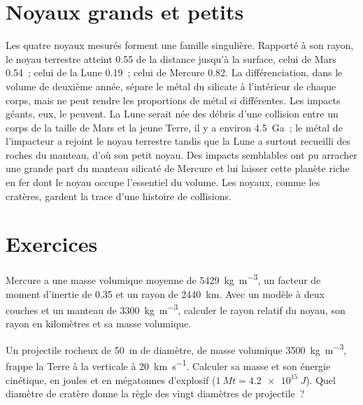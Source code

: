 \section{Noyaux grands et petits}\label{sec:b3:planetary-interiors-surfaces:cores}

Les quatre noyaux mesurés forment une famille singulière. Rapporté à son rayon, le
noyau terrestre atteint 0.55 de la distance jusqu'à la surface, celui de Mars 0.54~;
celui de la Lune 0.19~; celui de Mercure 0.82. La différenciation, dans le volume de
deuxième année, sépare le métal du silicate à l'intérieur de chaque corps, mais ne peut rendre les
proportions de métal si différentes. Les impacts géants, eux, le peuvent. La Lune serait
née des débris d'une collision entre un corps de la taille de Mars et la jeune Terre, il y a
environ 4.5~Ga~; le métal de l'impacteur a rejoint le noyau terrestre tandis que la Lune a
surtout recueilli des roches du manteau, d'où son petit noyau. Des impacts semblables ont pu
arracher une grande part du manteau silicaté de Mercure et lui laisser cette planète riche
en fer dont le noyau occupe l'essentiel du volume.
Les noyaux, comme les cratères, gardent la trace d'une histoire de collisions.

\section{Exercices}

\begin{exercise}[$\star$]\label{exo:b3:planetary-interiors-surfaces:1}
Mercure a une masse volumique moyenne de \qty{5429}{kg.m^{-3}}, un facteur de moment
d'inertie de 0.35 et un rayon de \qty{2440}{km}. Avec un modèle à deux couches et un
manteau de \qty{3300}{kg.m^{-3}}, calculer le rayon relatif du noyau, son rayon en
kilomètres et sa masse volumique.
\end{exercise}

\begin{exercise}[$\star$]\label{exo:b3:planetary-interiors-surfaces:2}
Un projectile rocheux de \qty{50}{m} de diamètre, de masse volumique \qty{3500}{kg.m^{-3}},
frappe la Terre à la verticale à \qty{20}{km.s^{-1}}. Calculer sa masse et
son énergie cinétique, en joules et en mégatonnes d'explosif
($\qty{1}{Mt} = \qty{4.2e15}{J}$). Quel diamètre de cratère donne la règle des
vingt diamètres de projectile~?
\end{exercise}

